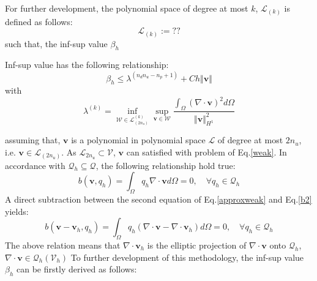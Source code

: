 For further development, the polynomial space of degree at most $k$, $\mathcal L_{(k)}$ is defined as follows:
\begin{equation}
    \mathcal L_{(k)} := ??
\end{equation}
such that, the inf-sup value $\beta_h$
\begin{thm}
    Inf-sup value has the following relationship:
\begin{equation}
    \beta_h \le \lambda^{(n_d n_u-n_p+1)} + C h \Vert \boldsymbol v \Vert
\end{equation}
with
\begin{equation}
    \lambda^{(k)} = \inf_{\mathcal W \in \mathcal L_{(2n_u)}^{(k)}} \sup_{\boldsymbol v \in \mathcal W} 
    \frac{\int_\Omega (\nabla \cdot \boldsymbol v)^2 d\Omega}{\Vert \boldsymbol v \Vert_{H^1}^2}
\end{equation}
\end{thm}
\begin{pf}

\end{pf}
assuming that, $\boldsymbol v$ is a polynomial in polynomial space $\mathcal L$ of degree at most $2n_u$, i.e. $\boldsymbol v \in \mathcal L_{(2n_u)}$. 
As $\mathcal L_{2n_u} \subset \mathcal V$, $\boldsymbol v$ can satisfied with problem of Eq.\eqref{weak}.
In accordance with $\mathcal Q_h \subseteq \mathcal Q$, the following relationship hold true:
\begin{equation}\label{b2}
b(\boldsymbol v,q_h) = \int_{\Omega} q_h \nabla \cdot \boldsymbol v d\Omega = 0, \quad \forall q_h \in \mathcal Q_h
\end{equation}
A direct subtraction between the second equation of Eq.\eqref{approxweak} and Eq.\eqref{b2} yields: 
\begin{equation}
b(\boldsymbol v - \boldsymbol v_h, q_h) = \int_{\Omega} q_h (\nabla\cdot \boldsymbol v - \nabla \cdot \boldsymbol v_h)d\Omega = 0, \quad \forall q_h \in \mathcal Q_h
\end{equation}
The above relation means that $\nabla \cdot \boldsymbol v_h$ is the elliptic projection of $\nabla \cdot \boldsymbol v$ onto $\mathcal Q_h$, 
$\nabla \cdot \boldsymbol v \in \mathcal Q_h(\mathcal V_h)$
To further development of this methodology, the inf-sup value $\beta_h$ can be firstly derived as follows:
